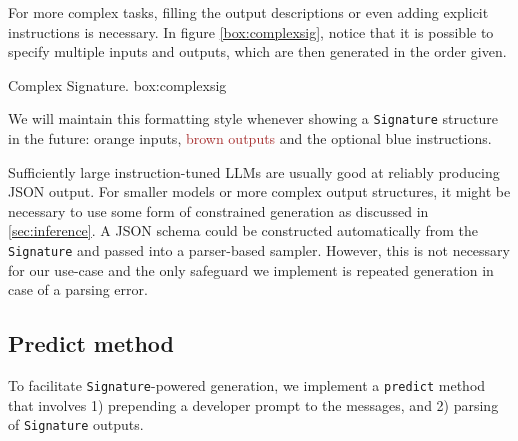 For more complex tasks, filling the output descriptions or even adding explicit instructions is necessary.
In figure \ref{box:complexsig}, notice that it is possible to specify multiple inputs and outputs, which are then generated in the order given.

\begin{figurebox}{Complex Signature. }{box:complexsig}
\end{figurebox}

We will maintain this formatting style whenever showing a \texttt{Signature} structure in the future: \textcolor{ctuorange}{orange inputs}, \textcolor{brown}{brown outputs} and the optional \textcolor{ctublue}{blue instructions}.

Sufficiently large instruction-tuned LLMs are usually good at reliably producing JSON output.
For smaller models or more complex output structures, it might be necessary to use some form of constrained generation as discussed in \ref{sec:inference}.
A JSON schema could be constructed automatically from the \texttt{Signature} and passed into a parser-based sampler.
However, this is not necessary for our use-case and the only safeguard we implement is repeated generation in case of a parsing error.

\subsection{Predict method}
To facilitate \texttt{Signature}-powered generation, we implement a \texttt{predict} method that 
involves 1) prepending a developer prompt to the messages, and 2) parsing of \texttt{Signature} outputs.

